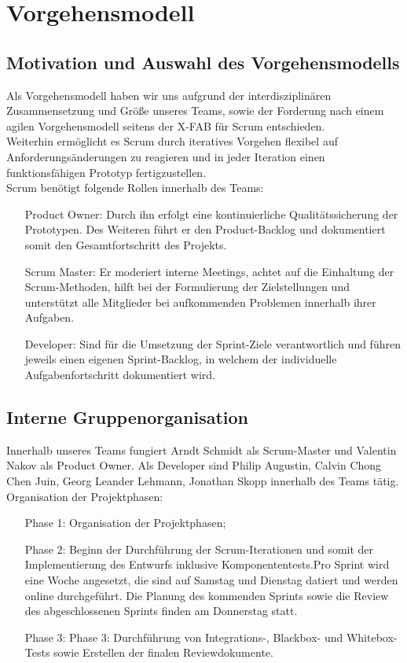 \chapter{Vorgehensmodell}
\section{Motivation und Auswahl des Vorgehensmodells}

Als Vorgehensmodell haben wir uns aufgrund der interdisziplinären Zusammensetzung und Größe unseres Teams, sowie der Forderung nach einem agilen Vorgehensmodell seitens der X-FAB für Scrum entschieden.\\
Weiterhin ermöglicht es Scrum durch iteratives Vorgehen flexibel auf Anforderungsänderungen zu reagieren und in jeder Iteration einen funktionsfähigen Prototyp fertigzustellen.\\

Scrum benötigt folgende Rollen innerhalb des Teams:
\begin{itemize}
	\item[Product Owner:] Durch ihn erfolgt eine kontinuierliche Qualitätssicherung der Prototypen. Des Weiteren führt er den Product-Backlog und dokumentiert somit den Gesamtfortschritt des Projekts.

	\item[Scrum Master:] Er moderiert interne Meetings, achtet auf die Einhaltung der Scrum-Methoden, hilft bei der Formulierung der Zielstellungen und unterstützt alle Mitglieder bei aufkommenden Problemen innerhalb ihrer Aufgaben.

	\item[Developer:]
	Sind für die Umsetzung der Sprint-Ziele verantwortlich und führen jeweils einen eigenen Sprint-Backlog, in welchem der individuelle Aufgabenfortschritt dokumentiert wird.

\end{itemize}

\section{Interne Gruppenorganisation}
Innerhalb unseres Teams fungiert Arndt Schmidt als Scrum-Master und Valentin Nakov als Product Owner. Als Developer sind Philip Augustin, Calvin Chong Chen Juin, Georg Leander Lehmann, Jonathan Skopp innerhalb des Teams tätig.\\
\clearpage
Organisation der Projektphasen:
\begin{itemize}
	\item[Phase 1:] Organisation der Projektphasen;
	\item[Phase 2:] Beginn der Durchführung der Scrum-Iterationen und somit der Implementierung des Entwurfs inklusive Komponententests.Pro Sprint wird eine Woche angesetzt, die  sind auf Samstag und Dienstag datiert und werden online durchgeführt. Die Planung des kommenden Sprints sowie die Review des abgeschlossenen Sprints finden am Donnerstag statt.
	\item[Phase 3:] Phase 3: Durchführung von Integrations-, Blackbox- und Whitebox-Tests sowie Erstellen der finalen Reviewdokumente.


\end{itemize}
\clearpage
